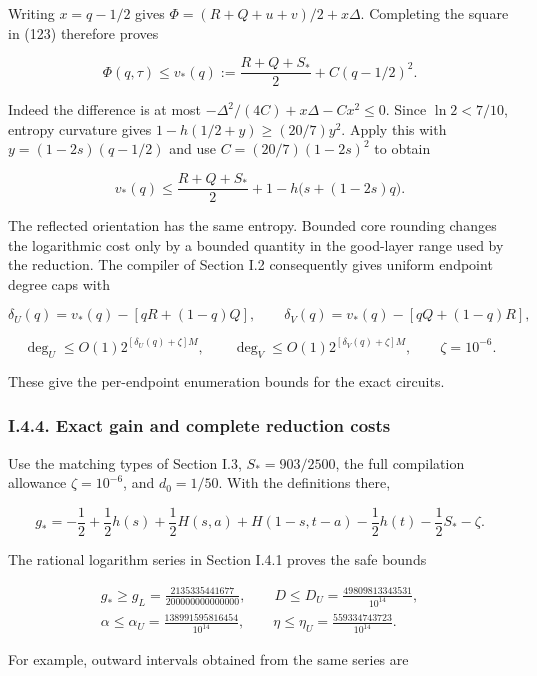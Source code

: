 Writing \(x=q-1/2\) gives \(\Phi=(R+Q+u+v)/2+x\Delta\). Completing the square in (123) therefore proves

\[
\Phi(q,\tau)\le v_*(q):=\frac{R+Q+S_*}{2}+C(q-1/2)^2.
\tag{126}
\]

Indeed the difference is at most \(-\Delta^2/(4C)+x\Delta-Cx^2\le0\). Since \(\ln2<7/10\), entropy curvature gives \(1-h(1/2+y)\ge(20/7)y^2\). Apply this with \(y=(1-2s)(q-1/2)\) and use \(C=(20/7)(1-2s)^2\) to obtain

\[
v_*(q)\le\frac{R+Q+S_*}{2}+1-h\bigl(s+(1-2s)q\bigr).
\tag{127}
\]

The reflected orientation has the same entropy. Bounded core rounding changes the logarithmic cost only by a bounded quantity in the good-layer range used by the reduction. The compiler of Section I.2 consequently gives uniform endpoint degree caps with

\[
\delta_U(q)=v_*(q)-[qR+(1-q)Q],\qquad
\delta_V(q)=v_*(q)-[qQ+(1-q)R],
\]

\[
\deg_U\le O(1)2^{[\delta_U(q)+\zeta]M},\qquad
\deg_V\le O(1)2^{[\delta_V(q)+\zeta]M},\qquad\zeta=10^{-6}.
\tag{128}
\]

These give the per-endpoint enumeration bounds for the exact circuits.

\hypertarget{af-a9ec399514-i.4.4.-exact-gain-and-complete-reduction-costs}{%
\subsubsection{I.4.4. Exact gain and complete reduction costs}\label{af-a9ec399514-i.4.4.-exact-gain-and-complete-reduction-costs}}

Use the matching types of Section I.3, \(S_*=903/2500\), the full compilation allowance \(\zeta=10^{-6}\), and \(d_0=1/50\). With the definitions there,

\[
g_*=-\frac12+\frac12h(s)+\frac12H(s,a)
+H(1-s,t-a)-\frac12h(t)-\frac12S_*-\zeta.
\]

The rational logarithm series in Section I.4.1 proves the safe bounds

\[
\begin{gathered}
g_*\ge g_L=\frac{2135335441677}{200000000000000},\qquad
D\le D_U=\frac{49809813343531}{10^{14}},\\
\alpha\le\alpha_U=\frac{138991595816454}{10^{14}},\qquad
\eta\le\eta_U=\frac{559334743723}{10^{14}}.
\end{gathered}
\tag{129}
\]

For example, outward intervals obtained from the same series are

